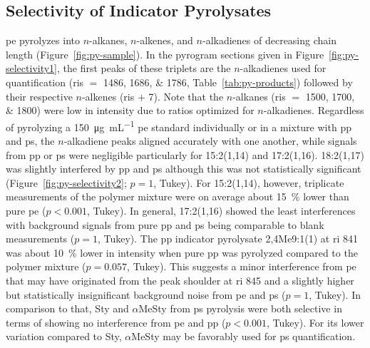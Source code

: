 \subsection{Selectivity of Indicator Pyrolysates}\label{sec:selectivity}

\Ac{pe} pyrolyzes into $n$-alkanes, $n$-alkenes, and $n$-alkadienes of decreasing chain length (Figure~\ref{fig:py-sample}). In the pyrogram sections given in Figure~\ref{fig:py-selectivity1}, the first peaks of these triplets are the $n$-alkadienes used for quantification (\acp{ri} $=$ \numlist{1486;1686;1786}, Table~\ref{tab:py-products}) followed by their respective $n$-alkenes (\acp{ri} $+$ \num{7}). Note that the $n$-alkanes (\acp{ri} $=$ \numlist{1500;1700;1800}) were low in intensity due to \si{\mz} ratios optimized for $n$-alkadienes.
Regardless of pyrolyzing a \SI{150}{\micro\gram\per\milli\liter} \ac{pe} standard individually or in a mixture with \ac{pp} and \ac{ps}, the $n$-alkadiene peaks aligned accurately with one another, while signals from \ac{pp} or \ac{ps} were negligible particularly for 15:2(1,14) and 17:2(1,16). 18:2(1,17) was slightly interfered by \ac{pp} and \ac{ps} although this was not statistically significant (Figure~\ref{fig:py-selectivity2}; $p = 1$, Tukey). For 15:2(1,14), however, triplicate measurements of the polymer mixture were on average about \SI{15}{\percent} lower than pure \ac{pe} ($p < 0.001$, Tukey). In general, 17:2(1,16) showed the least interferences with background signals from pure \ac{pp} and \ac{ps} being comparable to blank measurements ($p = 1$, Tukey).
The \ac{pp} indicator pyrolysate 2,4Me9:1(1) at \ac{ri} \num{841} was about \SI{10}{\percent} lower in intensity when pure \ac{pp} was pyrolyzed compared to the polymer mixture ($p = 0.057$, Tukey). This suggests a minor interference from \ac{pe} that may have originated from the peak shoulder at \ac{ri} 845 and a slightly higher but statistically insignificant background noise from \ac{pe} and \ac{ps} ($p = 1$, Tukey).
In comparison to that, Sty and $\alpha$MeSty from \ac{ps} pyrolysis were both selective in terms of showing no interference from \ac{pe} and \ac{pp} ($p < 0.001$, Tukey). For its lower variation compared to Sty, $\alpha$MeSty may be favorably used for \ac{ps} quantification.

